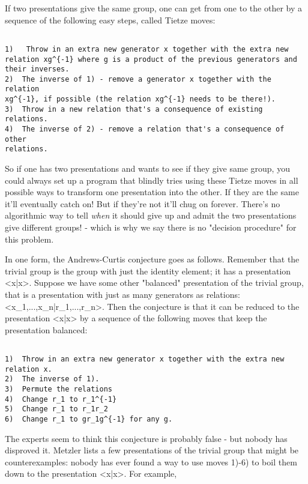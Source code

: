 If two presentations give the same group, one can get from one to the
other by a sequence of the following easy steps, called Tietze moves:


\begin{verbatim}

1)   Throw in an extra new generator x together with the extra new
relation xg^{-1} where g is a product of the previous generators and
their inverses.
2)  The inverse of 1) - remove a generator x together with the relation
xg^{-1}, if possible (the relation xg^{-1} needs to be there!).
3)  Throw in a new relation that's a consequence of existing relations.
4)  The inverse of 2) - remove a relation that's a consequence of other
relations.  
\end{verbatim}
    

So if one has two presentations and wants to see if they give same
group, you could always set up a program that blindly tries using these
Tietze moves in all possible ways to transform one presentation into the
other.  If they are the same it'll eventually catch on!  But if they're
not it'll chug on forever.  There's no algorithmic way to tell \emph{when} it
should give up and admit the two presentations give different groups! -
which is why we say there is no "decision procedure" for this problem.  

In one form, the Andrews-Curtis conjecture goes as follows.  Remember
that the trivial group is the group with just the identity element; it
has a presentation <x|x>.  Suppose we have some other "balanced" presentation
of the trivial group, that is a presentation with just as many
generators as relations: <x_1,...,x_n|r_1,...,r_n>.  Then the conjecture
is that it can be reduced to the presentation <x|x> by a sequence of the
following moves that keep the presentation balanced:


\begin{verbatim}

1)  Throw in an extra new generator x together with the extra new
relation x.
2)  The inverse of 1).
3)  Permute the relations
4)  Change r_1 to r_1^{-1}
5)  Change r_1 to r_1r_2
6)  Change r_1 to gr_1g^{-1} for any g.
\end{verbatim}
    

The experts seem to think this conjecture is probably false - but
nobody has disproved it.   Metzler lists a few presentations of the
trivial group that might be counterexamples: nobody has ever found a way
to use moves 1)-6) to boil them down to the presentation <x|x>.  For example,


